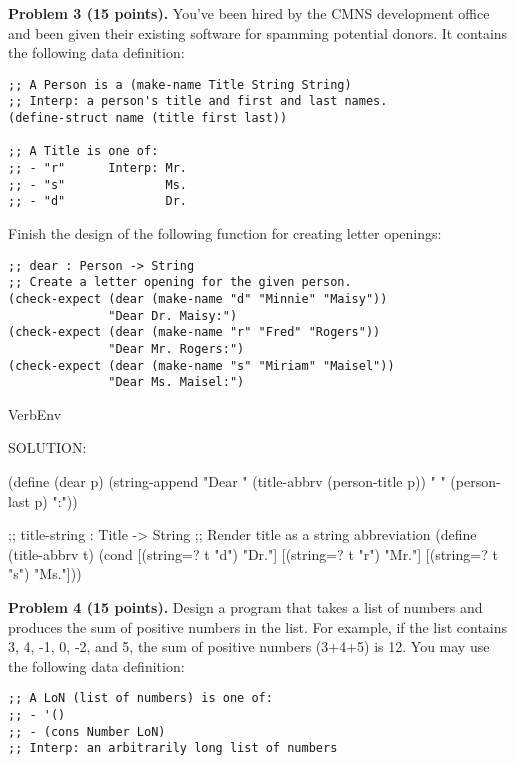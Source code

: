 \documentclass[12pt]{article}
\begin{document}

\newpage

\noindent
{\bf Problem 3 (15 points).}
%
You've been hired by the CMNS development office and been given their
existing software for spamming potential donors.  It contains the following
data definition:
\begin{verbatim}
;; A Person is a (make-name Title String String)
;; Interp: a person's title and first and last names.
(define-struct name (title first last))

;; A Title is one of:
;; - "r"      Interp: Mr.
;; - "s"              Ms.
;; - "d"              Dr.
\end{verbatim}

\noindent
Finish the design of the following function for creating letter
openings:
\begin{verbatim}
;; dear : Person -> String
;; Create a letter opening for the given person.
(check-expect (dear (make-name "d" "Minnie" "Maisy"))
              "Dear Dr. Maisy:")
(check-expect (dear (make-name "r" "Fred" "Rogers"))
              "Dear Mr. Rogers:")
(check-expect (dear (make-name "s" "Miriam" "Maisel"))
              "Dear Ms. Maisel:")
\end{verbatim}


\begin{SaveVerbatim}{VerbEnv}

SOLUTION:

(define (dear p)
  (string-append "Dear " (title-abbrv (person-title p)) " " (person-last p) ":"))

;; title-string : Title -> String
;; Render title as a string abbreviation
(define (title-abbrv t)
  (cond [(string=? t "d") "Dr."]
        [(string=? t "r") "Mr."]
        [(string=? t "s") "Ms."]))
\end{SaveVerbatim}


\newpage
\noindent
{\bf Problem 4 (15 points).}  
%
Design a program that takes a list of numbers and produces the sum of
positive numbers in the list.  For example, if the list contains 3, 4,
-1, 0, -2, and 5, the sum of positive numbers (3+4+5) is 12.  You may
use the following data definition:

\begin{verbatim}
;; A LoN (list of numbers) is one of:
;; - '()
;; - (cons Number LoN)
;; Interp: an arbitrarily long list of numbers
\end{verbatim}
\end{document}
